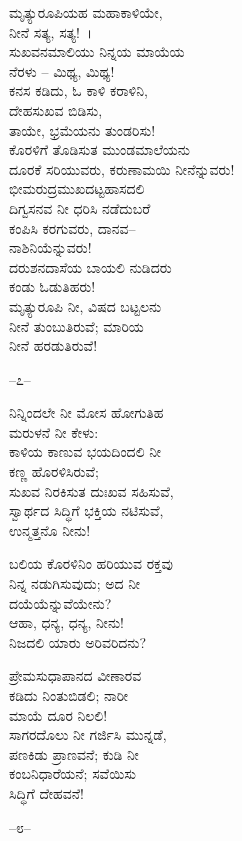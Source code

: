 ಮೃತ್ಯುರೂಪಿಯಹ ಮಹಾಕಾಳಿಯೇ,\\ನೀನೆ ಸತ್ಯ, ಸತ್ಯ!~।\\ಸುಖವನಮಾಲಿಯು ನಿನ್ನಯ ಮಾಯೆಯ\\ನೆರಳು – ಮಿಥ್ಯ, ಮಿಥ್ಯ!\\ಕನಸ ಕಡಿದು, ಓ ಕಾಳಿ ಕರಾಳಿನಿ,\\ದೇಹಸುಖವ ಬಿಡಿಸು,\\ತಾಯೇ, ಭ್ರಮೆಯನು ತುಂಡರಿಸು!\\ಕೊರಳಿಗೆ ತೊಡಿಸುತ ಮುಂಡಮಾಲೆಯನು\\ದೂರಕೆ ಸರಿಯುವರು, ಕರುಣಾಮಯಿ ನೀನೆನ್ನುವರು!\\ಭೀಮರುದ್ರಮುಖದಟ್ಟಹಾಸದಲಿ\\ದಿಗ್ವಸನವ ನೀ ಧರಿಸಿ ನಡೆದುಬರೆ\\ಕಂಪಿಸಿ ಕರಗುವರು, ದಾನವ–\\ನಾಶಿನಿಯೆನ್ನುವರು!\\ದರುಶನದಾಸೆಯ ಬಾಯಲಿ ನುಡಿದರು\\ಕಂಡು ಓಡುತಿಹರು!\\ಮೃತ್ಯುರೂಪಿ ನೀ, ವಿಷದ ಬಟ್ಟಲನು\\ನೀನೆ ತುಂಬುತಿರುವೆ; ಮಾರಿಯ\\ನೀನೆ ಹರಡುತಿರುವೆ!

\begin{center}
–೭–
\end{center}

ನಿನ್ನಿಂದಲೇ ನೀ ಮೋಸ ಹೋಗುತಿಹ\\ಮರುಳನೆ ನೀ ಕೇಳು:\\ಕಾಳಿಯ ಕಾಣುವ ಭಯದಿಂದಲಿ ನೀ\\ಕಣ್ಣ ಹೊರಳಿಸಿರುವೆ;\\ಸುಖವ ನಿರಕಿಸುತ ದುಃಖವ ಸಹಿಸುವೆ,\\ಸ್ವಾರ್ಥದ ಸಿದ್ಧಿಗೆ ಭಕ್ತಿಯ ನಟಿಸುವೆ,\\ಉನ್ಮತ್ತನೊ ನೀನು!

ಬಲಿಯ ಕೊರಳಿನಿಂ ಹರಿಯುವ ರಕ್ತವು\\ನಿನ್ನ ನಡುಗಿಸುವುದು; ಅದ ನೀ\\ದಯೆಯೆನ್ನುವೆಯೇನು?\\ಆಹಾ, ಧನ್ಯ, ಧನ್ಯ, ನೀನು!\\
 ನಿಜದಲಿ ಯಾರು ಅರಿವರಿದನು?

ಪ್ರೇಮಸುಧಾಪಾನದ ವೀಣಾರವ\\ಕಡಿದು ನಿಂತುಬಿಡಲಿ; ನಾರೀ\\ಮಾಯೆ ದೂರ ನಿಲಲಿ!\\ಸಾಗರದೊಲು ನೀ ಗರ್ಜಿಸಿ ಮುನ್ನಡೆ,\\ಪಣಕಿಡು ಪ್ರಾಣವನೆ; ಕುಡಿ ನೀ\\ಕಂಬನಿಧಾರೆಯನೆ; ಸವೆಯಿಸು\\ಸಿದ್ಧಿಗೆ ದೇಹವನೆ!

\begin{center}
–೮–
\end{center}

